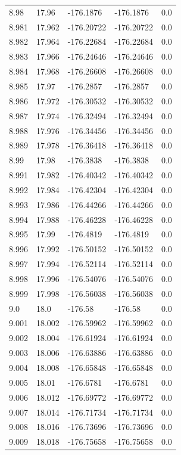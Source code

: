 \begin{tabular}{lllll}
8.98 & 17.96 & -176.1876 & -176.1876 & 0.0 \\
8.981 & 17.962 & -176.20722 & -176.20722 & 0.0 \\
8.982 & 17.964 & -176.22684 & -176.22684 & 0.0 \\
8.983 & 17.966 & -176.24646 & -176.24646 & 0.0 \\
8.984 & 17.968 & -176.26608 & -176.26608 & 0.0 \\
8.985 & 17.97 & -176.2857 & -176.2857 & 0.0 \\
8.986 & 17.972 & -176.30532 & -176.30532 & 0.0 \\
8.987 & 17.974 & -176.32494 & -176.32494 & 0.0 \\
8.988 & 17.976 & -176.34456 & -176.34456 & 0.0 \\
8.989 & 17.978 & -176.36418 & -176.36418 & 0.0 \\
8.99 & 17.98 & -176.3838 & -176.3838 & 0.0 \\
8.991 & 17.982 & -176.40342 & -176.40342 & 0.0 \\
8.992 & 17.984 & -176.42304 & -176.42304 & 0.0 \\
8.993 & 17.986 & -176.44266 & -176.44266 & 0.0 \\
8.994 & 17.988 & -176.46228 & -176.46228 & 0.0 \\
8.995 & 17.99 & -176.4819 & -176.4819 & 0.0 \\
8.996 & 17.992 & -176.50152 & -176.50152 & 0.0 \\
8.997 & 17.994 & -176.52114 & -176.52114 & 0.0 \\
8.998 & 17.996 & -176.54076 & -176.54076 & 0.0 \\
8.999 & 17.998 & -176.56038 & -176.56038 & 0.0 \\
9.0 & 18.0 & -176.58 & -176.58 & 0.0 \\
9.001 & 18.002 & -176.59962 & -176.59962 & 0.0 \\
9.002 & 18.004 & -176.61924 & -176.61924 & 0.0 \\
9.003 & 18.006 & -176.63886 & -176.63886 & 0.0 \\
9.004 & 18.008 & -176.65848 & -176.65848 & 0.0 \\
9.005 & 18.01 & -176.6781 & -176.6781 & 0.0 \\
9.006 & 18.012 & -176.69772 & -176.69772 & 0.0 \\
9.007 & 18.014 & -176.71734 & -176.71734 & 0.0 \\
9.008 & 18.016 & -176.73696 & -176.73696 & 0.0 \\
9.009 & 18.018 & -176.75658 & -176.75658 & 0.0 \\

\end{tabular}
